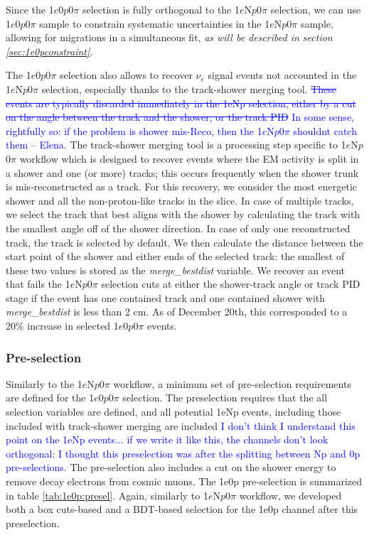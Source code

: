 \documentclass[a4paper]{article}
\newcommand{\npsel}{1$e$N$p$0$\pi$ }
\newcommand{\zpsel}{1$e$0$p$0$\pi$ }
\begin{document}

Since the \zpsel selection is fully orthogonal to the \npsel selection, we can use \zpsel sample to constrain systematic uncertainties in the \npsel sample, allowing for migrations in a simultaneous fit, \emph{as will be described in section \ref{sec:1e0pconstraint}}.

The \zpsel selection also allows to recover $\nu_e$ signal events not accounted in the \npsel selection, especially thanks to the track-shower merging tool.  \textcolor{blue}{ \st{These events are typically discarded immediately in the 1eNp selection, either by a cut on the angle between the track and the shower, or the track PID} In some sense, rightfully so: if the problem is shower mis-Reco, then the \npsel shouldnt catch them -- Elena}.  
The track-shower merging tool is a processing step specific to \npsel workflow which is designed to recover events where the EM activity is split in a shower and one (or more)  tracks; this occurs frequently when the shower trunk is mis-reconstructed as a track. For this recovery, we consider the most energetic shower and all the non-proton-like tracks in the slice.  In case of multiple tracks, we select the track that best aligns with the shower by calculating the track with the smallest angle off of the shower direction. In case of only one reconstructed track, the track is selected by default. We then calculate the distance between the start point of the shower and either ends of the selected track:  the smallest of these two values is stored as the  \emph{merge\_bestdist} variable.  We recover an event that fails the \npsel selection cuts at either the shower-track angle or track PID stage if the event has one contained track and one contained shower with \emph{merge\_bestdist} is less than 2 cm. As of December 20th, this corresponded to a 20\% increase in selected \zpsel events.


\subsubsection{Pre-selection}
Similarly to the \npsel workflow, a minimum set of pre-selection requirements are defined for the \zpsel selection.  The preselection requires that the all selection variables are defined, and all potential 1eNp events, including those included with track-shower merging are included \textcolor{blue}{I don't think I understand this point on the 1eNp events... if we write it like this, the channels don't look orthogonal: I thought this preselection was after the splitting between Np and 0p pre-selections}.  The pre-selection also includes a cut on the shower energy to remove decay electrons from cosmic muons.
The 1e0p pre-selection is summarized in table \ref{tab:1e0p:presel}. Again, similarly to \npsel workflow, we developed both a box cuts-based and a BDT-based selection for the 1e0p channel after this preselection.
\end{document}
